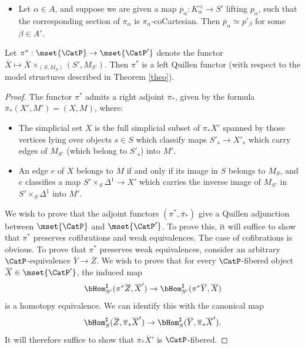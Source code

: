 \begin{proposition}
\begin{itemize}
\item[$(ix)$] Let $\alpha \in A$, and suppose we are given a map $\overline{p}_{\alpha}: K^{\triangleleft}_{\alpha} \rightarrow S'$ lifting $p_{\alpha}$, such that the corresponding
section of $\pi_{\alpha}$ is $\pi_{\alpha}$-coCartesian. Then $\overline{p}_{\alpha} \simeq p'_{\beta}$ for some $\beta \in A'$. 
\end{itemize}

Let $\pi^{\ast}: \mset{ \CatP} \rightarrow \mset{\CatP'}$ denote the functor
$\overline{X} \mapsto \overline{X} \times_{ (S, M_{S})} (S', M_{S'})$. Then
$\pi^{\ast}$ is a left Quillen functor (with respect to the model structures described in
Theorem \ref{theo}).
\end{proposition}

\begin{proof}
The functor $\pi^{\ast}$ admits a right adjoint $\overline{\pi}_{\ast}$, given by the formula
$\overline{\pi}_{\ast} (X',M') = (X,M)$, where:
\begin{itemize}
\item[$(a)$] The simplicial set $X$ is the full simplicial subset of
$\pi_{\ast} X'$ spanned by those vertices lying over objects $s \in S$ which classify maps
$S'_{s} \rightarrow X'_{s}$ which carry edges of $M_{S'}$ (which belong to $S'_{s}$)
into $M'$.
\item[$(b)$] An edge $e$ of $X$ belongs to $M$ if and only if its image in
$S$ belongs to $M_{S}$, and $e$ classifies a map
$S' \times_{ S} \Delta^1 \rightarrow X'$ which carries the inverse image of
$M_{S'}$ in $S' \times_{S} \Delta^1$ into $M'$. 
\end{itemize}
We wish to prove that the adjoint functors $(\pi^{\ast}, \overline{\pi}_{\ast})$ give
a Quillen adjunction between $\mset{ \CatP}$ and $\mset{ \CatP'}$. 
To prove this, it will suffice to show that $\pi^{\ast}$ preserves cofibrations and
weak equivalences. The case of cofibrations is obvious. To prove that
$\pi^{\ast}$ preserves weak equivalences, consider an arbitrary $\CatP$-equivalence $\overline{Y} \rightarrow \overline{Z}$. We wish to prove that for every $\CatP$-fibered object $\overline{X} \in \mset{ \CatP'}$, the induced map
$$ \bHom_{S'}^{\sharp}( \pi^{\ast} \overline{Z}, \overline{X}') 
\rightarrow \bHom_{S'}^{\sharp}( \pi^{\ast} \overline{Y}, \overline{X} )$$
is a homotopy equivalence. We can identify this with the canonical map
$$ \bHom_{S}^{\sharp}( \overline{Z}, \overline{\pi}_{\ast} \overline{X}')
\rightarrow \bHom_{S}^{\sharp}( \overline{Y}, \overline{\pi}_{\ast} \overline{X}').$$
It will therefore suffice to show that $\overline{\pi}_{\ast} \overline{X}'$ is $\CatP$-fibered.


\end{proof}
